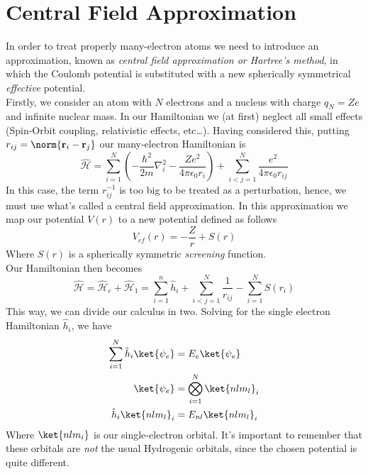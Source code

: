 \documentclass[a4paper, 11pt]{book}
\renewcommand{\vec}[1]{\mathbf{#1}}
\newcommand{\1}{\opr{\mathds{1}}}
\newcommand{\ham}{\mathcal{H}}
\newcommand{\opr}[1]{\hat{#1}}
\theoremstyle{plain}
\begin{document}
	\section{Central Field Approximation}
	In order to treat properly many-electron atoms we need to introduce an approximation, known as \textit{central field approximation or Hartree's method}, in which the Coulomb potential is substituted with a new spherically symmetrical \textit{effective} potential.\\
	Firstly, we consider an atom with $N$ electrons and a nucleus with charge $q_N=Ze$ and infinite nuclear mass. In our Hamiltonian we (at first) neglect all small effects (Spin-Orbit coupling, relativistic effects, etc\ldots). Having considered this, putting $r_{ij}=\norm{\vec{r}_i-\vec{r}_j}$ our many-electron Hamiltonian is
	\begin{equation}
		\opr{\ham}=\sum_{i=1}^N\left( -\frac{\hbar^2}{2m}\nabla^2_i-\frac{Ze^2}{4\pi\epsilon_0r_i} \right)+\sum_{i<j=1}^N\frac{e^2}{4\pi\epsilon_0r_{ij}}
		\label{eq:manyelectronhamiltonianatomic}
	\end{equation}
	In this case, the term $r_{ij}^{-1}$ is too big to be treated as a perturbation, hence, we must use what's called a central field approximation. In this approximation we map our potential $V(r)$ to a new potential defined as follows
	\begin{equation}
		V_{cf}(r)=-\frac{Z}{r}+S(r)
		\label{eq:newpotential}
	\end{equation}
	Where $S(r)$ is a spherically symmetric \textit{screening} function.\\
	Our Hamiltonian then becomes
	\begin{equation}
		\opr{\ham}=\opr{\ham}_e+\opr{\ham}_1=\sum_{i=1}^n\opr{h}_i+\sum_{i<j=1}^N\frac{1}{r_{ij}}-\sum_{i=1}^NS(r_i)
		\label{eq:hartreehamiltonian}
	\end{equation}
	This way, we can divide our calculus in two. Solving for the single electron Hamiltonian $\opr{h}_i$, we have
	\begin{equation}
		\begin{aligned}
			\sum_{i=1}^N\opr{h}_i\ket{\psi_e}&=E_e\ket{\psi_e}\\
			\ket{\psi_e}&=\bigotimes_{i=1}^N\ket{nlm_l}_i\\
			\opr{h}_i\ket{nlm_l}_i&=E_{nl}\ket{nlm_l}_i
		\end{aligned}
		\label{eq:hartreeapprox}
	\end{equation}
	Where $\ket{nlm_i}$ is our single-electron orbital. It's important to remember that these orbitals are \emph{not} the usual Hydrogenic orbitals, since the chosen potential is quite different.\\
\end{document}
